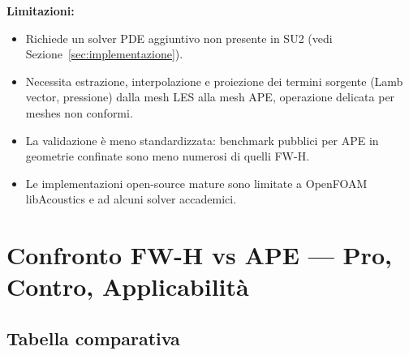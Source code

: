 \documentclass[11pt,a4paper]{article}
\begin{document}
\textbf{Limitazioni:}
\begin{itemize}
  \item Richiede un solver PDE aggiuntivo non presente in SU2 (vedi
        Sezione~\ref{sec:implementazione}).
  \item Necessita estrazione, interpolazione e proiezione dei termini sorgente
        (Lamb vector, pressione) dalla mesh LES alla mesh APE, operazione
        delicata per meshes non conformi.
  \item La validazione è meno standardizzata: benchmark pubblici per APE in
        geometrie confinate sono meno numerosi di quelli FW-H.
  \item Le implementazioni open-source mature sono limitate a OpenFOAM
        libAcoustics e ad alcuni solver accademici.
\end{itemize}

\section{Confronto FW-H vs APE — Pro, Contro, Applicabilità}
\label{sec:confronto}

\subsection{Tabella comparativa}
\end{document}
